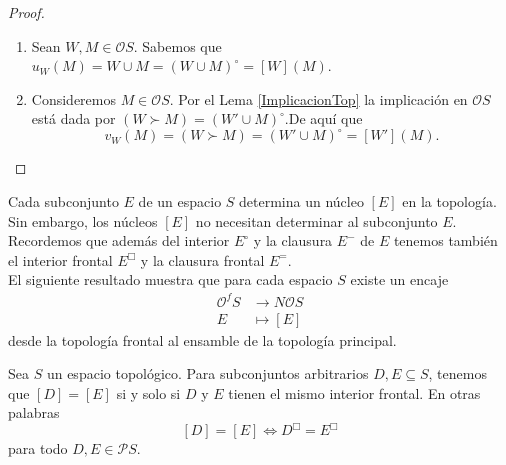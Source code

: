 \begin{proof}
    \begin{enumerate}[$i)$]
        \item Sean $W, M\in \mathcal{O}S$. Sabemos que $u_W(M)=W\cup M=(W\cup M)^\circ=[W](M)$.
        \item Consideremos $M\in \mathcal{O}S$. Por el Lema \ref{ImplicacionTop} la implicación en $\mathcal{O}S$ está dada por $(W\succ M)=(W'\cup M)^\circ$.De aquí que 
        \[
        v_W(M)=(W\succ M)=(W'\cup M)^\circ=[W'](M).
        \]
    \end{enumerate}
\end{proof}

Cada subconjunto $E$ de un espacio $S$ determina un núcleo $[E]$ en la topología. Sin embargo, los núcleos $[E]$ no necesitan determinar al subconjunto $E$.\\

Recordemos que además del interior $E^\circ$ y la clausura $E^-$ de $E$ tenemos también el interior frontal $E^\Box$ y la clausura frontal $E^=$.\\

El siguiente resultado muestra que para cada espacio $S$ existe un encaje 
\[
\begin{split}
    \mathcal{O}^fS& \to N\mathcal{O}S\\
    E& \mapsto [E]
\end{split}
\]
desde la topología frontal al ensamble de la topología principal.

\begin{lem}
    Sea $S$ un espacio topológico. Para subconjuntos arbitrarios $D, E\subseteq S$, tenemos que $[D]=[E]$ si y solo si $D$ y $E$ tienen el mismo interior frontal. En otras palabras
    \[
    [D]=[E]\Leftrightarrow D^\Box =E^\Box
    \]
    para todo $D, E\in \mathcal{P}S$.
\end{lem}

